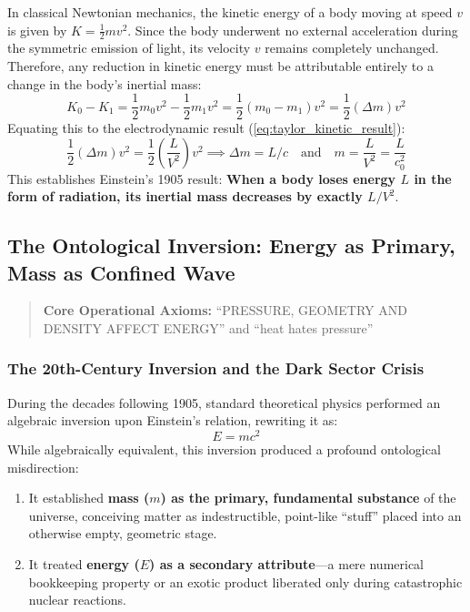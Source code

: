 \documentclass[11pt,a4paper]{article}
\begin{document}
In classical Newtonian mechanics, the kinetic energy of a body moving at speed $v$ is given by $K = \frac{1}{2} m v^2$. Since the body underwent no external acceleration during the symmetric emission of light, its velocity $v$ remains completely unchanged. Therefore, any reduction in kinetic energy must be attributable entirely to a change in the body's inertial mass:
\begin{equation}
K_0 - K_1 = \frac{1}{2} m_0 v^2 - \frac{1}{2} m_1 v^2 = \frac{1}{2} (m_0 - m_1) v^2 = \frac{1}{2} (\Delta m) v^2
\end{equation}
Equating this to the electrodynamic result (\ref{eq:taylor_kinetic_result}):
\begin{equation}
\frac{1}{2} (\Delta m) v^2 = \frac{1}{2} \left( \frac{L}{V^2} \right) v^2 \implies \Delta m = L / c \quad \text{and} \quad m = \frac{L}{V^2} = \frac{L}{c_0^2}
\label{eq:delta_m_proven}
\end{equation}
This establishes Einstein's 1905 result: \textbf{When a body loses energy $L$ in the form of radiation, its inertial mass decreases by exactly $L/V^2$}.

\subsection{The Ontological Inversion: Energy as Primary, Mass as Confined Wave}

\begin{quote}
\textbf{Core Operational Axioms:} ``PRESSURE, GEOMETRY AND DENSITY AFFECT ENERGY'' and ``heat hates pressure''
\end{quote}


\label{subsec:ontological_inversion}

\subsubsection{The 20th-Century Inversion and the Dark Sector Crisis}

During the decades following 1905, standard theoretical physics performed an algebraic inversion upon Einstein's relation, rewriting it as:
\begin{equation}
E = m c^2
\end{equation}
While algebraically equivalent, this inversion produced a profound ontological misdirection:
\begin{enumerate}
    \item It established \textbf{mass ($m$) as the primary, fundamental substance} of the universe, conceiving matter as indestructible, point-like ``stuff'' placed into an otherwise empty, geometric stage.
    \item It treated \textbf{energy ($E$) as a secondary attribute}---a mere numerical bookkeeping property or an exotic product liberated only during catastrophic nuclear reactions.
\end{enumerate}
\end{document}
